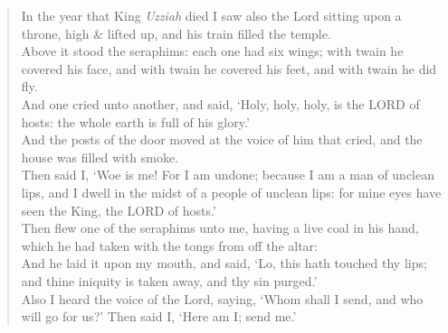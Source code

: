 \documentclass[MAIN]{subfiles}
\begin{document}
\begin{verse}
In the year that King \emph{Uzziah} died I saw also the Lord sitting upon a throne, high \& lifted up, and his train filled the temple.\\
Above it stood the seraphims: each one had six wings; with twain he covered his face, and with twain he covered his feet, and with twain he did fly.\\
And one cried unto another, and said, `Holy, holy, holy, is the {\hge LORD} of hosts: the whole earth is full of his glory.'\\
And the posts of the door moved at the voice of him that cried, and the house was filled with smoke.\\
Then said I, `Woe is me! For I am undone; because I am a man of unclean lips, and I dwell in the midst of a people of unclean lips: for mine eyes have seen the King, the {\hge LORD} of hosts.'\\
Then flew one of the seraphims unto me, having a live coal in his hand, which he had taken with the tongs from off the altar:\\
And he laid it upon my mouth, and said, `Lo, this hath touched thy lips; and thine iniquity is taken away, and thy sin purged.'\\
Also I heard the voice of the Lord, saying, `Whom shall I send, and who will go for us?' Then said I, `Here am I; send me.'
\end{verse}
\end{document}

